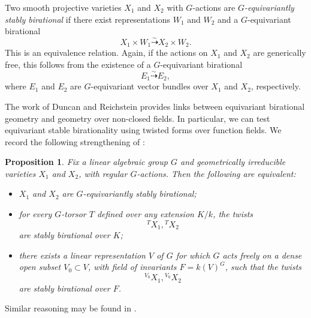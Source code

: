 \documentclass[12pt]{amsart}
\numberwithin{equation}{section}
\theoremstyle{plain}
\newtheorem{prop}{Proposition}[section]
\theoremstyle{definition}
\theoremstyle{remark}
\begin{document}
Two smooth projective varieties $X_1$ and $X_2$ with $G$-actions are {\em $G$-equivariantly stably birational} if there exist representations $W_1$ and $W_2$ and a $G$-equivariant birational
$$X_1 \times W_1 \stackrel{\sim}{\dashrightarrow} X_2 \times W_2.$$
This is an equivalence relation.  
Again, if the actions on $X_1$ and $X_2$ are generically free, this follows from 
the existence of a $G$-equivariant birational 
$$E_1 \stackrel{\sim}{\dashrightarrow} E_2,$$
where $E_1$ and $E_2$ are $G$-equivariant vector bundles over $X_1$ and $X_2$, 
respectively. 





The work of Duncan and Reichstein \cite{DR} provides links between equivariant
birational geometry and geometry over non-closed fields. In particular, we can test equivariant
stable birationality using twisted forms over function fields. 
We record the following strengthening of \cite[Th. 1.1]{DR}:

\begin{prop} 
\label{prop:dr}
Fix a linear algebraic group $G$ and geometrically irreducible varieties 
$X_1$ and $X_2$, with 
regular $G$-actions. Then the following are equivalent:
\begin{itemize} 
\item[(1)] $X_1$ and $X_2$ are $G$-equivariantly stably birational;
\item[(2)] for every $G$-torsor $T$
defined over any extension $K/k$, the twists
$${ }^T X_1, { }^TX_2$$
are stably birational over $K$;
\item[(3)] there exists a linear representation
$V$ of $G$ for which $G$ acts freely on a dense open subset
$V_0 \subset V$, with field of invariants $F=k(V)^G$,
such that the twists
$$
{ }^{V_0} X_1, { }^{V_0}X_2
$$
are stably birational over $F$.
\end{itemize}
\end{prop}
Similar reasoning may be found in \cite[{\S}2]{KrTs26}.
\end{document}
